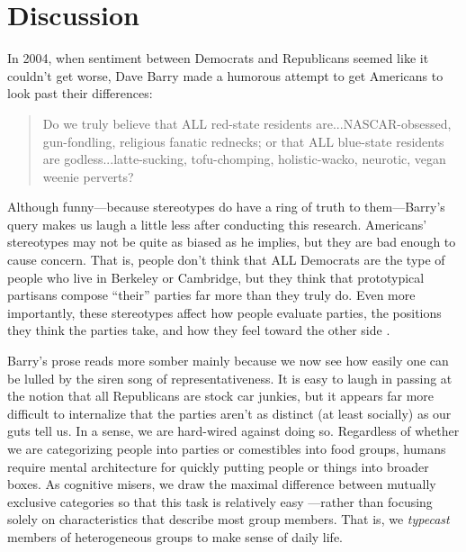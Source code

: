 \documentclass[12pt, letterpaper]{article}
\begin{document}
\section{Discussion}

In 2004, when sentiment between Democrats and Republicans seemed like it couldn't get worse, Dave Barry made a humorous attempt to get Americans to look past their differences: \nocite{barry2004nyt}
\begin{quotation}
\noindent Do we truly believe that ALL red-state residents are...NASCAR-obsessed, gun-fondling, religious fanatic rednecks; or that ALL blue-state residents are godless...latte-sucking, tofu-chomping, holistic-wacko, neurotic, vegan weenie perverts?
\end{quotation}
\noindent Although funny---because stereotypes do have a ring of truth to them---Barry's query makes us laugh a little less after conducting this research. Americans' stereotypes may not be quite as biased as he implies, but they are bad enough to cause concern. That is, people don't think that ALL Democrats are the type of people who live in Berkeley or Cambridge, but they think that prototypical partisans compose ``their'' parties far more than they truly do. Even more importantly, these stereotypes affect how people evaluate parties, the positions they think the parties take, and how they feel toward the other side \citep{ahler2018parties}. 

Barry's prose reads more somber mainly because we now see how easily one can be lulled by the siren song of representativeness. It is easy to laugh in passing at the notion that all Republicans are stock car junkies, but it appears far more difficult to internalize that the parties aren't as distinct (at least socially) as our guts tell us. In a sense, we are hard-wired against doing so. Regardless of whether we are categorizing people into parties or comestibles into food groups, humans require mental architecture for quickly putting people or things into broader boxes. As cognitive misers, we draw the maximal difference between mutually exclusive categories so that this task is relatively easy \citep{RoschMervis1975}---rather than focusing solely on characteristics that describe most group members. That is, we \emph{typecast} members of heterogeneous groups to make sense of daily life.
\end{document}
